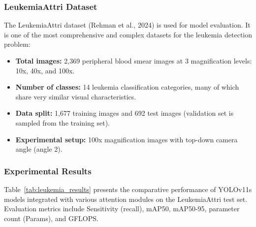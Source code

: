 \subsubsection{LeukemiaAttri Dataset}
The LeukemiaAttri dataset (Rehman et al., 2024) is used for model evaluation. It is one of the most comprehensive and complex datasets for the leukemia detection problem:
\begin{itemize}
    \item \textbf{Total images:} 2,369 peripheral blood smear images at 3 magnification levels: 10x, 40x, and 100x.
    \item \textbf{Number of classes:} 14 leukemia classification categories, many of which share very similar visual characteristics.
    \item \textbf{Data split:} 1,677 training images and 692 test images (validation set is sampled from the training set).
    \item \textbf{Experimental setup:} 100x magnification images with top-down camera angle (angle 2).
\end{itemize}

\subsubsection{Experimental Results}
Table~\ref{tab:leukemia_results} presents the comparative performance of YOLOv11s models integrated with various attention modules on the LeukemiaAttri test set. Evaluation metrics include Sensitivity (recall), mAP50, mAP50-95, parameter count (Params), and GFLOPS.

\begin{table}[h]
    \centering
    \caption{Performance results of object detectors on the LeukemiaAttri test set.}
    \label{tab:leukemia_results}
\end{table}

